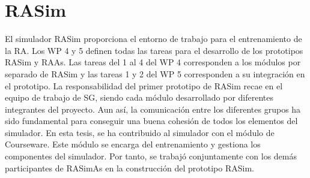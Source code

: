 \section{RASim}
\label{rasim:rasim}
El simulador \ac{RASim} proporciona el entorno de trabajo para el entrenamiento de la \ac{RA}. Los \ac{WP} 4 y 5 definen todas las tareas para el desarrollo de los prototipos \ac{RASim} y \ac{RAAs}. Las tareas del 1 al 4 del \ac{WP} 4 corresponden a los módulos por separado de \ac{RASim} y las tareas 1 y 2 del \ac{WP} 5 corresponden a su integración en el prototipo. 
La responsabilidad del primer prototipo de \ac{RASim} recae en el equipo de trabajo de \ac{SG}, siendo cada módulo desarrollado por diferentes integrantes del proyecto. Aun así, la comunicación entre los diferentes grupos ha sido fundamental para conseguir una buena cohesión de todos los elementos del simulador. En esta tesis, se ha contribuido al simulador con el módulo de \ac{Courseware}. Este módulo se encarga del entrenamiento y gestiona los componentes del simulador. Por tanto, se trabajó conjuntamente con los demás participantes de \ac{RASimAs} en la construcción del prototipo \ac{RASim}.




 


